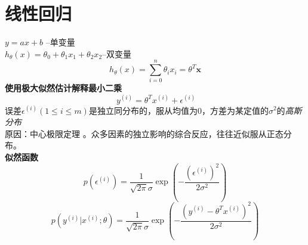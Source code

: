 \documentclass{ctexart}
\begin{document}
    \section{线性回归}
    $y=ax+b $ --单变量  \\
    $h_\theta(x) = \theta_0+\theta_1x_1+\theta_2x_2 $--双变量 \\
    \begin{equation}
      h_\theta(x) = \sum_{i=0}^{n}\theta_ix_i=\theta^T\bm x
    \end{equation}
    \textbf{使用极大似然估计解释最小二乘} \\
    \begin{equation}\
      y^{(i)}=\theta^Tx^{(i)}+\epsilon^{(i)}
    \end{equation}
    误差$\epsilon^{(i)}(1\leq i \leq m)$是独立同分布的，服从均值为0，方差为某定值的$\sigma^2$的\emph{高斯分布}\\
    原因：中心极限定理 。众多因素的独立影响的综合反应，往往近似服从正态分布。\\
    \textbf{似然函数} \\
    \begin{equation}
       p(\epsilon^{(i)}) = \frac{1}{\sqrt{2\pi}{\sigma}}\exp\left(-\frac{(\epsilon^{(i)})^2}{2\sigma^2}\right)
    \end{equation}
    \begin{equation}\label{eq:conditionGussian}
      p(y^{(i)}|x^{(i)};\theta) = \frac{1}{\sqrt{2\pi}{\sigma}}\exp\left(-\frac{(y^{(i)}-\theta^Tx^{(i)})^2}{2\sigma^2}\right)
    \end{equation}
\end{document}
